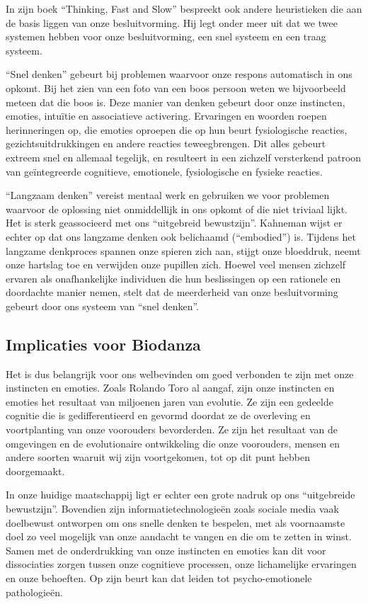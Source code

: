 \documentclass[
  11pt,
]{book}
\begin{document}
In zijn boek ``Thinking, Fast and Slow'' bespreekt \citet{Kahneman2012} ook andere heuristieken die aan de basis liggen van onze besluitvorming. Hij legt onder meer uit dat we twee systemen hebben voor onze besluitvorming, een snel systeem en een traag systeem.

``Snel denken'' gebeurt bij problemen waarvoor onze respons automatisch in ons opkomt. Bij het zien van een foto van een boos persoon weten we bijvoorbeeld meteen dat die boos is. Deze manier van denken gebeurt door onze instincten, emoties, intuïtie en associatieve activering. Ervaringen en woorden roepen herinneringen op, die emoties oproepen die op hun beurt fysiologische reacties, gezichtsuitdrukkingen en andere reacties teweegbrengen. Dit alles gebeurt extreem snel en allemaal tegelijk, en resulteert in een zichzelf versterkend patroon van geïntegreerde cognitieve, emotionele, fysiologische en fysieke reacties.

``Langzaam denken'' vereist mentaal werk en gebruiken we voor problemen waarvoor de oplossing niet onmiddellijk in ons opkomt of die niet triviaal lijkt. Het is sterk geassocieerd met ons ``uitgebreid bewustzijn''. Kahneman wijst er echter op dat ons langzame denken ook belichaamd (``embodied'') is. Tijdens het langzame denkproces spannen onze spieren zich aan, stijgt onze bloeddruk, neemt onze hartslag toe en verwijden onze pupillen zich. Hoewel veel mensen zichzelf ervaren als onafhankelijke individuen die hun beslissingen op een rationele en doordachte manier nemen, stelt \citet{Kahneman2012} dat de meerderheid van onze besluitvorming gebeurt door ons systeem van ``snel denken''.

\subsection{Implicaties voor Biodanza}\label{implicaties-voor-biodanza}

Het is dus belangrijk voor ons welbevinden om goed verbonden te zijn met onze instincten en emoties. Zoals Rolando Toro al aangaf, zijn onze instincten en emoties het resultaat van miljoenen jaren van evolutie. Ze zijn een gedeelde cognitie die is gedifferentieerd en gevormd doordat ze de overleving en voortplanting van onze voorouders bevorderden. Ze zijn het resultaat van de omgevingen en de evolutionaire ontwikkeling die onze voorouders, mensen en andere soorten waaruit wij zijn voortgekomen, tot op dit punt hebben doorgemaakt.

In onze huidige maatschappij ligt er echter een grote nadruk op ons ``uitgebreide bewustzijn''. Bovendien zijn informatietechnologieën zoals sociale media vaak doelbewust ontworpen om ons snelle denken te bespelen, met als voornaamste doel zo veel mogelijk van onze aandacht te vangen en die om te zetten in winst. Samen met de onderdrukking van onze instincten en emoties kan dit voor dissociaties zorgen tussen onze cognitieve processen, onze lichamelijke ervaringen en onze behoeften. Op zijn beurt kan dat leiden tot psycho-emotionele pathologieën.
\end{document}
